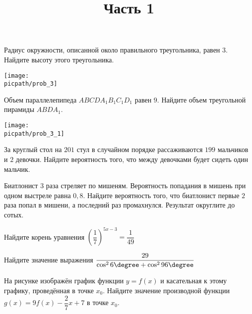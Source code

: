 %
%

\begin{training}[1]
	\title{Часть 1}
	\egepreambone
	\begin{listofex}
		\item
		\begin{minipage}[t]{\bodywidth}
			Радиус окружности, описанной около правильного треугольника, равен \( 3 \). Найдите высоту этого треугольника.
			\foranswer
		\end{minipage}
		\gapwidth
		\begin{minipage}[t]{\picwidth}
			\texttt{[image: \\picpath/prob\_3]}
		\end{minipage}
		\item
		\begin{minipage}[t]{\bodywidth}
			Объем параллелепипеда \( ABCDA_1B_1C_1D_1 \) равен \( 9 \). Найдите объем треугольной пирамиды \( ABDA_1 \).
			\foranswer
		\end{minipage}
		\gapwidth
		\begin{minipage}[t]{\picwidth}
			\texttt{[image: \\picpath/prob\_3\_1]}
		\end{minipage}
			\item За круглый стол на \( 201 \) стул в случайном порядке рассаживаются \( 199 \) мальчиков и \( 2 \) девочки. Найдите вероятность того, что между девочками будет сидеть один мальчик.
		\foranswer
		\item Биатлонист \( 3 \) раза стреляет по мишеням. Вероятность попадания в мишень при одном выстреле равна \( 0,8 \). Найдите вероятность того, что биатлонист первые \( 2 \) раза попал в мишени, а последний раз промахнулся. Результат округлите до сотых.
		\foranswer
	\end{listofex}
	\newpage
	\phantom{Часть 1}
	\begin{listofex}[resume]
		\item Найдите корень уравнения \( \left( \dfrac{1}{7} \right)^{5x-3}=\dfrac{1}{49} \)
		\foranswer
		\item Найдите значение выражения \( \dfrac{29}{\cos^26\degree+\cos^296\degree} \)
		\foranswer
		\item
		На рисунке изображён график функции \( y=f(x) \) и касательная к этому графику, проведённая в точке \( x_0 \). Найдите значение производной функции \( g(x)=9f(x)-\dfrac{2}{7}x+7 \) в точке \( x_0 \).
		\begin{center}

\end{center}
\end{listofex}
\end{training}
